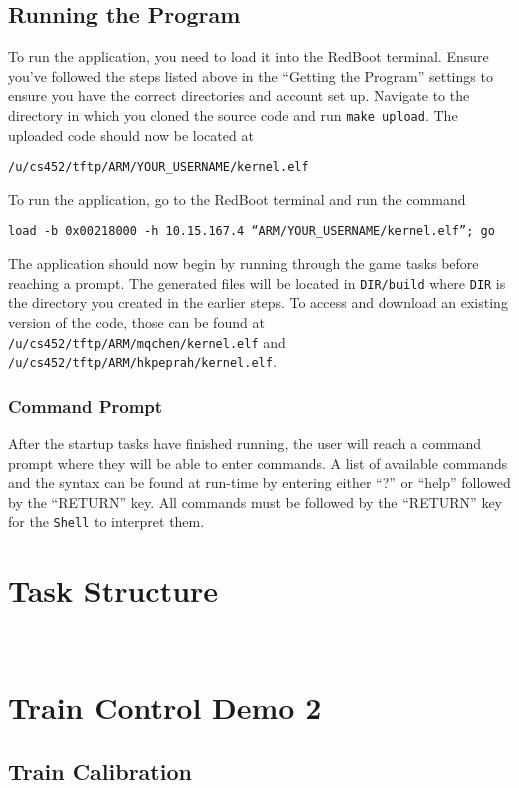\documentclass[12pt]{article}
\begin{document}
\subsection{Running the Program}
To run the application, you need to load it into the RedBoot terminal.  Ensure you've followed the steps listed above in the ``Getting the Program'' settings to ensure you have the correct directories and account set up.  Navigate to the directory in which you cloned the source code and run \texttt{make upload}.  The uploaded code should now be located at
\begin{center}
  \texttt{/u/cs452/tftp/ARM/YOUR\_USERNAME/kernel.elf}
\end{center}
To run the application, go to the RedBoot terminal and run the command
\begin{center}
  \texttt{load -b 0x00218000 -h 10.15.167.4 ``ARM/YOUR\_USERNAME/kernel.elf''; go}
\end{center}
The application should now begin by running through the game tasks before reaching a prompt.  The generated files will be located in \texttt{DIR/build} where \texttt{DIR} is the directory you created in the earlier steps.  To access and download an existing version of the code, those can be found at \texttt{/u/cs452/tftp/ARM/mqchen/kernel.elf} and \texttt{/u/cs452/tftp/ARM/hkpeprah/kernel.elf}.
\\
\subsubsection{Command Prompt}
After the startup tasks have finished running, the user will reach a command prompt where they will be able to enter commands.  A list of available commands and the syntax can be found at run-time by entering either ``?'' or ``help'' followed by the ``RETURN'' key.  All commands must be followed by the ``RETURN'' key for the {\tt Shell} to interpret them.
\\[2\baselineskip]
\section{Task Structure}
\\[2\baselineskip]
\section{Train Control Demo 2}
\subsection{Train Calibration}
\end{document}
